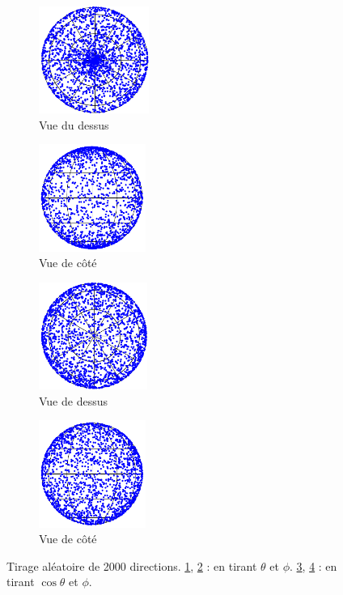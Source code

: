 \documentclass[11pt,a4paper]{article}
\numberwithin{equation}{section}
\begin{document}
\begin{figure}[h!]
\center
    \begin{subfigure}[b]{0.22\textwidth}
    	\center
    	\includegraphics[height=3.5cm]{figures/dessus1.pdf}
    	\caption{Vue du dessus}
    	\label{a}
    \end{subfigure}	
	\begin{subfigure}[b]{0.22\textwidth}
    	\center
    	\includegraphics[height=3.5cm]{figures/side1.pdf}
    	\caption{Vue de côté}
    	\label{b}
    \end{subfigure}
		\begin{subfigure}[b]{0.05\textwidth}
		\hspace{0.1cm}
    	\center
    \end{subfigure}
    \begin{subfigure}[b]{0.22\textwidth}
    	\center
    	\includegraphics[height=3.5cm]{figures/dessus2.pdf}
    	\caption{Vue de dessus}
    	\label{c}
    \end{subfigure}	
    \begin{subfigure}[b]{0.22\textwidth}
    	\center
    	\includegraphics[height=3.5cm]{figures/side2.pdf}
    	\caption{Vue de côté}
    	\label{d}
    \end{subfigure}	
    \caption{Tirage aléatoire de 2000 directions. \ref{a}, \ref{b} : en tirant  $\theta$ et $\phi$. \ref{c}, \ref{d} : en tirant  $\cos \theta$ et $\phi$.}
    \label{equipartition}
\end{figure}
\vspace{-0.6cm}
\end{document}

